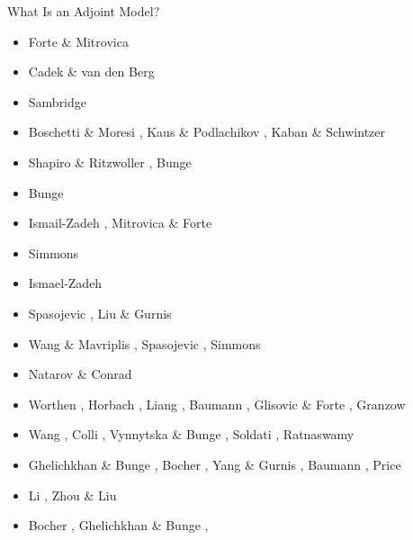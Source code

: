 What Is an Adjoint Model? \cite{erri97}

\begin{scriptsize}
\begin{itemize}
\item[\nineteenninetysix] Forte \& Mitrovica \cite{fomi96} 
\item[\nineteenninetyeight] Cadek \& van den Berg \cite{cava98}
\item[\nineteenninetynine] Sambridge \cite{samb99,samb99b}
\item[\twothousandone] Boschetti \& Moresi \cite{bomo01}, Kaus \& Podlachikov \cite{kapo01}, 
                       Kaban \& Schwintzer \cite{kasc01}
\item[\twothousandtwo] Shapiro \& Ritzwoller \cite{shri02}, Bunge \etal \cite{burb02}
\item[\twothousandthree] Bunge \etal \cite{buht03}
\item[\twothousandfour] Ismail-Zadeh \etal \cite{isst04}, Mitrovica \& Forte \cite{mifo04}
\item[\twothousandsix] Simmons \etal \cite{sifg06}
\item[\twothousandseven] Ismael-Zadeh \etal \cite{isks07}
\item[\twothousandeight] Spasojevic \etal \cite{splg08}, Liu \& Gurnis \cite{ligu08}
\item[\twothousandnine] Wang \& Mavriplis \cite{wama09}, Spasojevic \etal \cite{splg09},
                        Simmons \etal \cite{sifg09}
\item[\twothousandtwelve] Natarov \& Conrad \cite{naco12}
\item[\twothousandfourteen] Worthen \etal \cite{wosp14}, Horbach \etal \cite{hobo14},
                            Liang \etal \cite{licl14}, Baumann \etal \cite{bakp14},
                            Glisovic \& Forte \cite{glfo14}, Granzow \cite{gran14}
\item[\twothousandfifteen] Wang \etal \cite{wahg15}, Colli \etal \cite{cobs15},
                           Vynnytska \& Bunge \cite{vybu15}, Soldati \etal \cite{sobd15},
                           Ratnaswamy \etal \cite{rasg15}
\item[\twothousandsixteen] Ghelichkhan \& Bunge \cite{ghbu16}, Bocher \etal \cite{bocf16},
                           Yang \& Gurnis \cite{yagu16}, Baumann \cite{baum16},
                           Price \cite{pric16}
\item[\twothousandseventeen] Li \etal \cite{ligs17}, Zhou \& Liu \cite{zhli17}
\item[\twothousandeighteen] Bocher \etal \cite{bofc18}, Ghelichkhan \& Bunge \cite{ghbu18}, 

\end{itemize}
\end{scriptsize}
